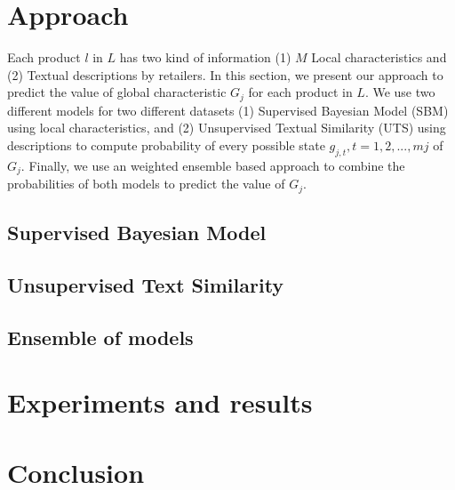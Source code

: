 \documentclass[a4page,10pt]{article}
\begin{document}
\section{Approach}
Each product $l$ in $L$ has two kind of information (1) $M$ Local characteristics and (2) Textual descriptions by retailers. In this section, we present our approach to predict the value of global characteristic $G_j$ for each product in $L$. We use two different models for two different datasets (1) Supervised Bayesian Model (SBM) using local characteristics, and (2) Unsupervised Textual Similarity (UTS) using descriptions to compute probability of every possible state $g_{j,t}, t = 1, 2, ..., m j$ of $G_j$. Finally, we use an weighted ensemble based approach to combine the probabilities of both models to predict the value of $G_j$.
\subsection{Supervised Bayesian Model}\label{sec:BGM}

\subsection{Unsupervised Text Similarity}\label{sec:tir}

\subsection{Ensemble of models}\label{sec:ensemble}

\section{Experiments and results}\label{sec:experiment}

%
\section{Conclusion}\label{sec:conc}




\end{document}

